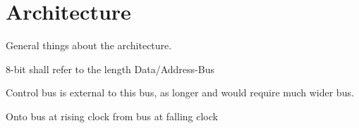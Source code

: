 \section{Architecture}

General things about the architecture. 

8-bit shall refer to the length Data/Address-Bus

Control bus is external to this bus, as longer and would require much wider bus.


Onto bus at rising clock
from bus at falling clock




















